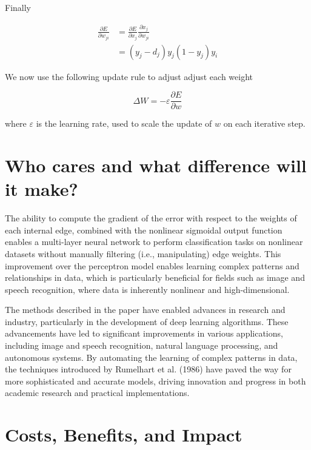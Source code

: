 \documentclass[10pt]{article}
\begin{document}
Finally

\begin{align}
    \frac{\partial E}{\partial w_{ji}} & = \frac{\partial E}{\partial x_{j}} \frac{\partial x_{j}}{\partial w_{ji}} \\
                                       & = (y_j - d_j) y_j(1-y_j) y_{i}
\end{align}

We now use the following update rule to adjust adjust each weight

$$ \Delta W = - \varepsilon \frac{\partial E}{\partial w} $$

where $\varepsilon$ is the learning rate, used to scale the update of $w$ on each iterative step.

\section*{Who cares and what difference will it make?}

The ability to compute the gradient of the error with respect to the weights of each internal edge, combined with the nonlinear sigmoidal output function enables a multi-layer neural network to perform classification tasks on nonlinear datasets without manually filtering (i.e., manipulating) edge weights. This improvement over the perceptron model enables learning complex patterns and relationships in data, which is particularly beneficial for fields such as image and speech recognition, where data is inherently nonlinear and high-dimensional.

The methods described in the paper have enabled advances in research and industry, particularly in the development of deep learning algorithms. These advancements have led to significant improvements in various applications, including image and speech recognition, natural language processing, and autonomous systems. By automating the learning of complex patterns in data, the techniques introduced by Rumelhart et al. (1986) have paved the way for more sophisticated and accurate models, driving innovation and progress in both academic research and practical implementations.

\section*{Costs, Benefits, and Impact}
\end{document}

